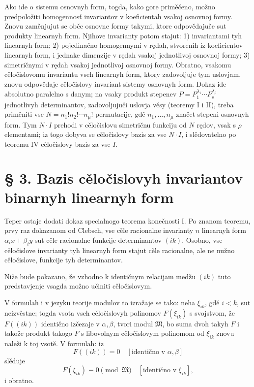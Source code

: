 \documentclass[11pt]{article}
\providecommand{\frM}{\mathfrak M}
\begin{document}
Ako ide o sistemu osnovnyh form, togda, kako gore priměčeno, možno predpoložiti homogennosť invariantov v koeficientah vsakoj osnovnoj formy. Znovu zaměnjujut se obče osnovne formy takymi, ktore odpovědajuče sut produkty linearnyh form. Njihove invarianty potom stajut: 1) invariantami tyh linearnyh form; 2) pojedinačno homogennymi v rędah, stvorenih iz koeficientov linearnyh form, i jednake dimenzije v rędah vsakoj jednotlivoj osnovnoj formy; 3) simetričnymi v rędah vsakoj jednotlivoj osnovnoj formy. Obratno, vsakomu cěločislovomu invariantu vseh linearnyh form, ktory zadovoljuje tym uslovjam, znovu odpovědaje cěločislovy invariant sistemy osnovnyh form. Dokaz ide absolutno paralelno s danym; na vsaky produkt stepenev \(P=P_1^{\lambda_1}\cdots P_\rho^{\lambda_\rho}\) jednotlivyh determinantov, zadovoljujuči uslovja věsy (teoremy I i II), treba priměniti vse \(N=n_1!n_2!\cdots n_\mu!\) permutacije, gdě \(n_1,\ldots,n_\mu\) značet stepeni osnovnyh form. Tym \(N\cdot I\) prehodi v cěločislovu simetričnu funkciju od \(N\) rędov, vsak s \(\rho\) elementami; iz togo dobyva se cěločislovy bazis za vse \(N\cdot I\), i slědovatelno po teoremu IV cěločislovy bazis za vse \(I\).

\setcounter{equation}{0}
\section*{§ 3. Bazis cěločislovyh invariantov binarnyh linearnyh form}

Teper ostaje dodati dokaz specialnogo teorema konečnosti I. Po znanom teoremu, prvy raz dokazanom od Clebsch, vse cěle racionalne invarianty \(n\) linearnyh form \(\alpha_i x+\beta_i y\) sut cěle racionalne funkcije determinantov \((ik)\). Osobno, vse cěločislove invarianty tyh linearnyh form stajut cěle racionalne, ale ne nužno cěločislove, funkcije tyh determinantov.

Niže bude pokazano, že vzhodno k identičnym relacijam medžu \((ik)\) tuto predstavjenje vsagda možno učiniti cěločislovym.

V formulah i v jezyku teorije modulov to izražaje se tako: neha \(\xi_{ik}\), gdě \(i<k\), sut neizvěstne; togda vsota vseh cěločislovyh polinomov \(F(\xi_{ik})\) s svojstvom, že \(F((ik))\) identično izčezaje v \(\alpha,\beta\), tvori modul \(\frM\), bo suma dvoh takyh \(F\) i takože produkt takogo \(F\) s libovolnym cěločislovym polinomom od \(\xi_{ik}\) znovu naleži k toj vsotě. V formulah: iz
\[
        F((ik))=0\quad [\text{identično v \(\alpha,\beta\)}]
\]
slěduje
\[
        F(\xi_{ik})\equiv0\pmod{\frM}\quad [\text{identično v \(\xi_{ik}\)}],
\]
i obratno.
\end{document}

